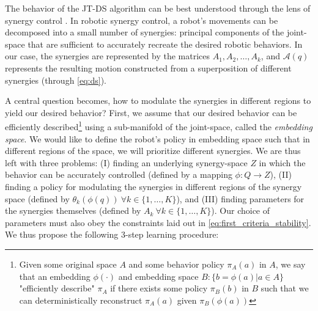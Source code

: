 \documentclass[letterpaper, 10 pt, conference,fleqn]{ieeeconf}
\begin{document}
The behavior of the JT-DS algorithm can be best understood through the lens of synergy control \cite{7954741}. In robotic synergy control, a robot's movements can be decomposed into a small number of synergies: principal components of the joint-space that are sufficient to accurately recreate the desired robotic behaviors. In our case, the synergies are represented by the matrices $A_1, A_2, \dots, A_k$, and $\mathcal{A}(q)$ represents the resulting motion constructed from a superposition of different synergies (through \eqref{eq:ds}). 

A central question becomes, how to modulate the synergies in different regions to yield our desired behavior? First, we assume that our desired behavior can be efficiently described\footnote{Given some original space $A$ and some behavior policy $\pi_A(a)$ in $A$, we say that an embedding $\phi(\cdot)$ and embedding space $B: \{b = \phi(a) | a \in A\}$ "efficiently describe" $\pi_A$ if there exists some policy $\pi_B(b)$ in $B$ such that we can deterministically reconstruct $\pi_A(a)$ given $\pi_B(\phi(a))$} using a sub-manifold of the joint-space, called the \emph{embedding space}. We would like to define the robot's policy in embedding space such that in different regions of the space, we will prioritize different synergies. We are thus left with three problems: (I) finding an underlying synergy-space $Z$ in which the behavior can be accurately controlled (defined by a mapping $\phi: Q \rightarrow Z$), (II) finding a policy for modulating the synergies in different regions of the synergy space (defined by $\theta_k(\phi(q))~\forall k\in\{1,\dots,K\}$), and (III) finding parameters for the synergies themselves (defined by $A_k~\forall k\in\{1,\dots,K\}$). Our choice of parameters must also obey the constraints laid out in \eqref{eq:first_criteria_stability}. We thus propose the following 3-step learning procedure:
\end{document}
